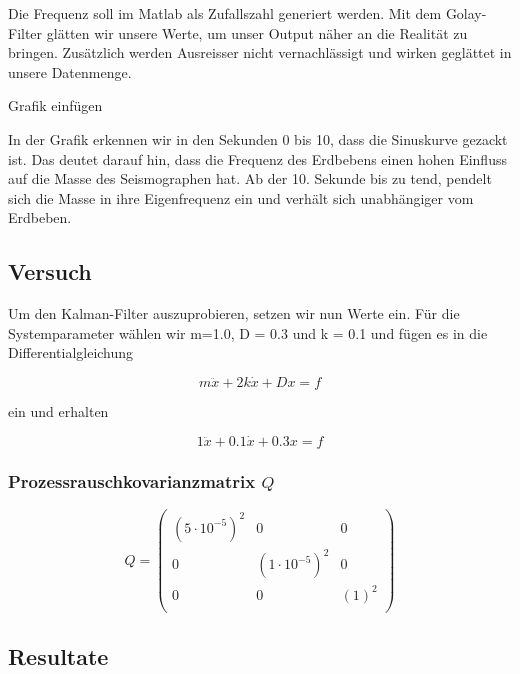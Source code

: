 Die Frequenz soll im Matlab als Zufallszahl generiert werden.
Mit dem Golay-Filter glätten wir unsere Werte, um unser Output näher an die Realität zu bringen. 
Zusätzlich werden Ausreisser nicht vernachlässigt und wirken geglättet in unsere Datenmenge.

Grafik einfügen

In der Grafik erkennen wir in den Sekunden 0 bis 10, dass die Sinuskurve gezackt ist.
Das deutet darauf hin, dass die Frequenz des Erdbebens einen hohen Einfluss auf die Masse des Seismographen hat.
Ab der 10. Sekunde bis zu tend, pendelt sich die Masse in ihre Eigenfrequenz ein und verhält sich unabhängiger vom Erdbeben.

\subsection{Versuch}
Um den Kalman-Filter auszuprobieren, setzen wir nun Werte ein.
Für die Systemparameter wählen wir m=1.0, D = 0.3 und k = 0.1 und fügen es in die Differentialgleichung

\begin{equation}
	m\ddot x + 2k \dot x + Dx = f	
\end{equation} 

ein und erhalten

\begin{equation}
	1\ddot x + 0.1 \dot x + 0.3x = f	
\end{equation} 


\subsubsection*{Prozessrauschkovarianzmatrix $Q$}





\begin{equation}
	Q = \left(
	\begin{array}{ccc} 	
		(5 \cdot 10^{-5})^2 & 0 & 0 \\ 
		0 & (1 \cdot 10^{-5})^2 & 0\\ 
		0 & 0& ( 1 )^2\\
	\end{array}\right)  
\end{equation} 





\subsection{Resultate}

